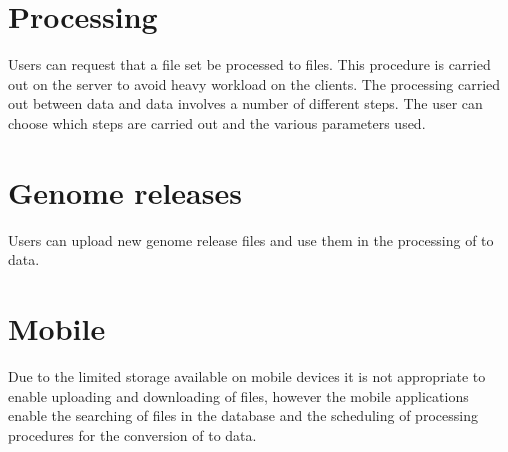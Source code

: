 \section{Processing}
Users can request that a  file set be processed to  files. This procedure is carried out on the server to avoid heavy workload on the clients. The processing carried out between  data and  data involves a number of different steps. The user can choose which steps are carried out and the various parameters used.

\section{Genome releases}
Users can upload new genome release files and use them in the processing of  to  data.

\section{Mobile}
Due to the limited storage available on mobile devices it is not appropriate to enable uploading and downloading of files, however the mobile applications enable the searching of files in the database and the scheduling of processing procedures for the conversion of  to  data.


